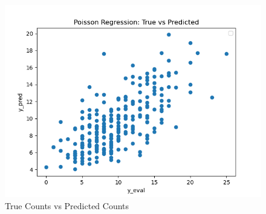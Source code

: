 \begin{answer}
\begin{figure}
    \centering
    \includegraphics[width=1\linewidth]{ps1/tex/img/poisson_pred.png}
    \caption{True Counts vs Predicted Counts}
    \label{fig:placeholder}
\end{figure}
\end{answer}
